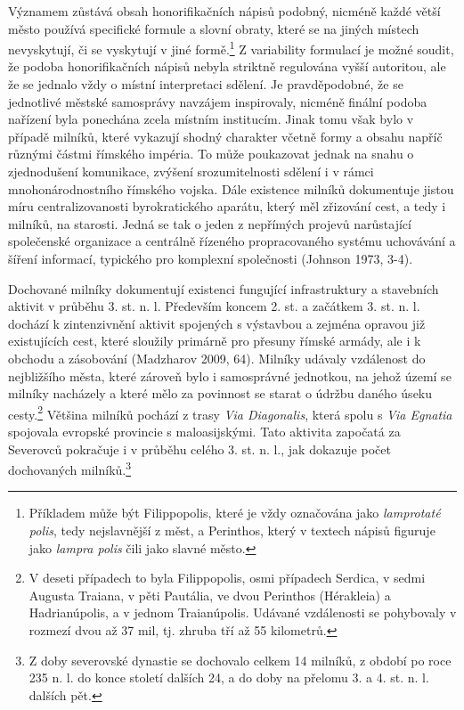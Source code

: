 Významem zůstává obsah honorifikačních nápisů podobný, nicméně každé větší město používá specifické formule a slovní obraty, které se na jiných místech nevyskytují, či se vyskytují v jiné formě.\footnote{Příkladem může být Filippopolis, které je vždy označována jako {\em lamprotaté polis}, tedy nejslavnější z měst, a Perinthos, který v textech nápisů figuruje jako {\em lampra polis} čili jako slavné město.} Z variability formulací je možné soudit, že podoba honorifikačních nápisů nebyla striktně regulována vyšší autoritou, ale že se jednalo vždy o místní interpretaci sdělení. Je pravděpodobné, že se jednotlivé městské samosprávy navzájem inspirovaly, nicméně finální podoba nařízení byla ponechána zcela místním institucím. Jinak tomu však bylo v případě milníků, které vykazují shodný charakter včetně formy a obsahu napříč různými částmi římského impéria. To může poukazovat jednak na snahu o zjednodušení komunikace, zvýšení srozumitelnosti sdělení i v rámci mnohonárodnostního římského vojska. Dále existence milníků dokumentuje jistou míru centralizovanosti byrokratického aparátu, který měl zřizování cest, a tedy i milníků, na starosti. Jedná se tak o jeden z nepřímých projevů narůstající společenské organizace a centrálně řízeného propracovaného systému uchovávání a šíření informací, typického pro komplexní společnosti (Johnson 1973, 3-4).

Dochované milníky dokumentují existenci fungující infrastruktury a stavebních aktivit v průběhu 3. st. n. l. Především koncem 2. st. a začátkem 3. st. n. l. dochází k zintenzivnění aktivit spojených s výstavbou a zejména opravou již existujících cest, které sloužily primárně pro přesuny římské armády, ale i k obchodu a zásobování (Madzharov 2009, 64). Milníky udávaly vzdálenost do nejbližšího města, které zároveň bylo i samosprávné jednotkou, na jehož území se milníky nacházely a které mělo za povinnost se starat o údržbu daného úseku cesty.\footnote{V deseti případech to byla Filippopolis, osmi případech Serdica, v sedmi Augusta Traiana, v pěti Pautália, ve dvou Perinthos (Hérakleia) a Hadrianúpolis, a v jednom Traianúpolis. Udávané vzdálenosti se pohybovaly v rozmezí dvou až 37 mil, tj. zhruba tří až 55 kilometrů.} Většina milníků pochází z trasy {\em Via Diagonalis}, která spolu s {\em Via Egnatia} spojovala evropské provincie s maloasijskými. Tato aktivita započatá za Severovců pokračuje i v průběhu celého 3. st. n. l., jak dokazuje počet dochovaných milníků.\footnote{Z doby severovské dynastie se dochovalo celkem 14 milníků, z období po roce 235 n. l. do konce století dalších 24, a do doby na přelomu 3. a 4. st. n. l. dalších pět.}

